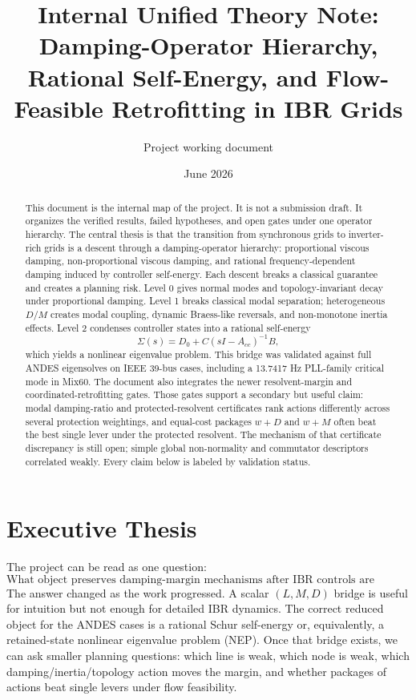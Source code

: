 \documentclass[11pt]{article}
\title{\bfseries Internal Unified Theory Note:\\
Damping-Operator Hierarchy, Rational Self-Energy, and Flow-Feasible Retrofitting in IBR Grids}
\author{Project working document}
\date{June 2026}
\begin{document}
\maketitle

\begin{abstract}
This document is the internal map of the project. It is not a submission draft.
It organizes the verified results, failed hypotheses, and open gates under one
operator hierarchy. The central thesis is that the transition from synchronous
grids to inverter-rich grids is a descent through a damping-operator hierarchy:
proportional viscous damping, non-proportional viscous damping, and rational
frequency-dependent damping induced by controller self-energy. Each descent
breaks a classical guarantee and creates a planning risk. Level 0 gives normal
modes and topology-invariant decay under proportional damping. Level 1 breaks
classical modal separation; heterogeneous $D/M$ creates modal coupling, dynamic
Braess-like reversals, and non-monotone inertia effects. Level 2 condenses
controller states into a rational self-energy
\[
  \Sigma(s)=D_0+C(sI-A_{cc})^{-1}B,
\]
which yields a nonlinear eigenvalue problem. This bridge was validated against
full ANDES eigensolves on IEEE 39-bus cases, including a 13.7417 Hz PLL-family
critical mode in Mix60. The document also integrates the newer resolvent-margin
and coordinated-retrofitting gates. Those gates support a secondary but useful
claim: modal damping-ratio and protected-resolvent certificates rank actions
differently across several protection weightings, and equal-cost packages
$w+D$ and $w+M$ often beat the best single lever under the protected resolvent.
The mechanism of that certificate discrepancy is still open; simple global
non-normality and commutator descriptors correlated weakly. Every claim below
is labeled by validation status.
\end{abstract}

\tableofcontents
\newpage

\section{Executive Thesis}

The project can be read as one question:
\[
  \text{What object preserves damping-margin mechanisms after IBR controls are condensed?}
\]
The answer changed as the work progressed. A scalar $(L,M,D)$ bridge is useful
for intuition but not enough for detailed IBR dynamics. The correct reduced
object for the ANDES cases is a rational Schur self-energy or, equivalently,
a retained-state nonlinear eigenvalue problem (NEP). Once that bridge exists,
we can ask smaller planning questions: which line is weak, which node is weak,
which damping/inertia/topology action moves the margin, and whether packages of
actions beat single levers under flow feasibility.
\end{document}

